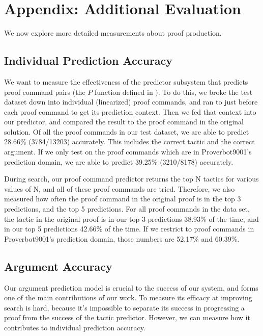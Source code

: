 \documentclass[sigplan,screen]{acmart}
\newcommand{\name}{Proverbot9001\xspace}
\renewcommand{\>}{\quad}
\begin{document}
\clearpage
\appendix
\section{Appendix: Additional Evaluation}
\label{sec:appendix}

We now explore more detailed measurements about proof production.










\subsection{Individual Prediction Accuracy}
\label{ssec:individual}

We want to measure the effectiveness of the predictor subsystem that predicts proof command pairs (the $P$ function defined in ).
To do this, we broke the test dataset down into individual (linearized) proof commands,
  and ran to just before each proof command to get its prediction context.
Then we fed that context into our predictor,
  and compared the result to the proof command in the original solution.
Of all the proof commands in our test dataset,
  we are able to predict 28.66\% (3784/13203) accurately.
This includes the correct tactic and the correct argument.
If we only test on the proof commands which are in \name{}'s prediction domain,
  we are able to predict 39.25\% (3210/8178) accurately.

During search, our proof command predictor returns the top N tactics for various values of N,
  and all of these proof commands are tried.
Therefore, we also measured how often the proof command in the original proof
  is in the top 3 predictions, and the top 5 predictions.
For all proof commands in the data set, the tactic in the original proof
  is in our top 3 predictions 38.93\% of the time, and in our top 5 predictions 42.66\% of the time.
If we restrict to proof commands in \name{}'s prediction domain, those numbers are 52.17\% and 60.39\%.

\subsection{Argument Accuracy}

Our argument prediction model is crucial to the success of our system,
  and forms one of the main contributions of our work.
To measure its efficacy at improving search is hard,
  because it's impossible to separate its success in progressing a proof
  from the success of the tactic predictor.
However, we can measure how it contributes to individual prediction accuracy.
\end{document}
